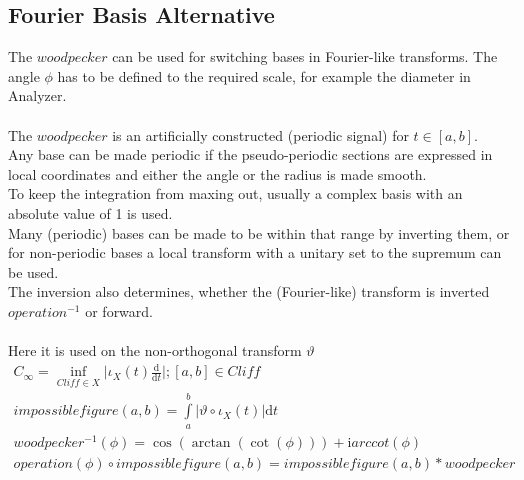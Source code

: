 \documentclass{report}
\begin{document}
\subsection{Fourier Basis Alternative}
The $woodpecker$ can be used for switching bases in Fourier-like transforms. The angle $\phi$ has to be defined to the required scale, for example the diameter in Analyzer.\\\\
The $woodpecker$ is an artificially constructed (periodic signal) for $t \in [a,b]$.\\
Any base can be made periodic if the pseudo-periodic sections are expressed in local coordinates and either the angle or the radius is made smooth.\\
To keep the integration from maxing out, usually a complex basis with an absolute value of 1 is used.\\
Many (periodic) bases can be made to be within that range by inverting them, or for non-periodic bases a local transform with a unitary set to the supremum can be used.\\
The inversion also determines, whether the (Fourier-like) transform is inverted $operation^{-1}$ or forward.\\\\
Here it is used on the non-orthogonal transform $\vartheta$
\begin{align}
C_{\infty}=\inf_{Cliff \in X} \lvert \iota_{X}(t) \frac{\mathrm{d}}{\mathrm{d}t} \rvert; [a,b] \in Cliff\\
impossiblefigure(a,b)=\int \limits _{a}^{b} \lvert\vartheta \circ \iota_{X}(t)\rvert\mathrm{d}t\\
woodpecker^{-1}(\phi)=\cos(\arctan(\cot(\phi))) + \mathrm{i} arccot(\phi)\\
operation(\phi) \circ impossiblefigure(a,b)=impossiblefigure(a,b)*woodpecker
\end{align}
\end{document}

